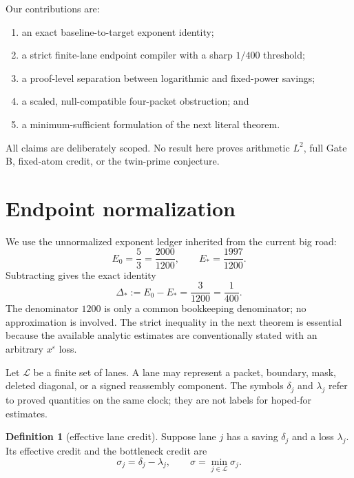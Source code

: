 \documentclass[11pt]{article}
\theoremstyle{definition}
\newtheorem{definition}{Definition}
\begin{document}
Our contributions are:
\begin{enumerate}
 \item an exact baseline-to-target exponent identity;
 \item a strict finite-lane endpoint compiler with a sharp $1/400$ threshold;
 \item a proof-level separation between logarithmic and fixed-power savings;
 \item a scaled, null-compatible four-packet obstruction; and
 \item a minimum-sufficient formulation of the next literal theorem.
\end{enumerate}

All claims are deliberately scoped.  No result here proves arithmetic $L^2$,
full Gate B, fixed-atom credit, or the twin-prime conjecture.

\section{Endpoint normalization}

We use the unnormalized exponent ledger inherited from the current big road:
\begin{equation}
 E_0=\frac53=\frac{2000}{1200},\qquad
 E_* = \frac{1997}{1200}.
 \label{eq:endpoints}
\end{equation}
Subtracting gives the exact identity
\begin{equation}
 \Delta_*:=E_0-E_* = \frac{3}{1200}=\frac1{400}.
 \label{eq:gap}
\end{equation}
The denominator $1200$ is only a common bookkeeping denominator; no
approximation is involved.  The strict inequality in the next theorem is
essential because the available analytic estimates are conventionally stated
with an arbitrary $x^\varepsilon$ loss.

Let $\mathcal L$ be a finite set of lanes.  A lane may represent a packet,
boundary, mask, deleted diagonal, or a signed reassembly component.  The
symbols $\delta_j$ and $\lambda_j$ refer to proved quantities on the same
clock; they are not labels for hoped-for estimates.

\begin{definition}[effective lane credit]
Suppose lane $j$ has a saving $\delta_j$ and a loss $\lambda_j$.  Its effective
credit and the bottleneck credit are
\begin{equation}
 \sigma_j=\delta_j-\lambda_j,\qquad
 \sigma=\min_{j\in\mathcal L}\sigma_j.
 \label{eq:credit}
\end{equation}
\end{definition}
\end{document}

